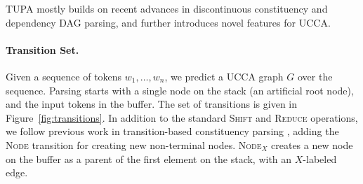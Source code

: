 \documentclass[11pt]{article}
\newcommand{\parser}[1]{TUPA\textsubscript{#1}}
\newcommand{\figref}[1]{Figure~\ref{#1}}
\begin{document}
\parser{} mostly builds on recent advances in discontinuous constituency
and dependency DAG parsing, and further introduces novel features for UCCA.

\paragraph{Transition Set.}
Given a sequence of tokens $w_1, \ldots, w_n$, we predict a UCCA graph $G$ over the sequence.
Parsing starts with a single node on the stack (an artificial root node), and the input tokens
in the buffer. The set of transitions is given in \figref{fig:transitions}.
In addition to the standard \textsc{Shift} and \textsc{Reduce} operations, 
we follow previous work in transition-based constituency parsing \cite{sagae2005classifier},
adding the \textsc{Node} transition for creating new non-terminal nodes.
\textsc{Node$_X$} creates a new node on the buffer as a parent of the first element on the stack, with an $X$-labeled edge.
\end{document}
